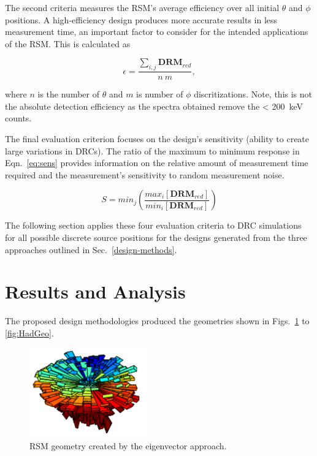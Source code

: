 \documentclass[3p,times]{elsarticle}
\begin{document}
The second criteria measures the RSM's average efficiency over all initial $\theta$ and $\phi$ positions.  
A high-efficiency design produces more accurate results in less measurement time, an important factor to consider for the intended applications of the RSM.  
This is calculated as 

\begin{equation}
\epsilon=\frac{\sum_{i,j}\mathbf{DRM}_{red}}{n\ m},
\label{eq:avgcell}
\end{equation}

\noindent where $n$ is the number of $\theta$ and $m$ is number of $\phi$ discritizations.
Note, this is not the absolute detection efficiency as the spectra obtained remove the < 200~keV counts.

The final evaluation criterion focuses on the design's sensitivity (ability to create large variations in DRCs).  
The ratio of the maximum to minimum response in Eqn.~\ref{eq:sens} provides information on the relative amount of measurement time required and the measurement's sensitivity to random measurement noise. 

\begin{equation}
S=min_{j}\left(\frac{max_{i} \left[\mathbf{DRM}_{red}\right]}{min_{i} \left[\mathbf{DRM}_{red}\right]}\right)
\label{eq:sens}
\end{equation}

The following section applies these four evaluation criteria to DRC simulations for all possible discrete source positions for the designs generated from the three approaches outlined in Sec.~\ref{design-methods}.

\section{Results and Analysis}
The proposed design methodologies produced the geometries shown in Figs.~\ref{fig:EVGeo} to \ref{fig:HadGeo}.

\begin{figure}[ht!]
\centering
\includegraphics[width={2.0in}]{../figs/EVGeo.pdf}
\caption{RSM geometry created by the eigenvector approach.}
\label{fig:EVGeo}
\end{figure}
\end{document}
